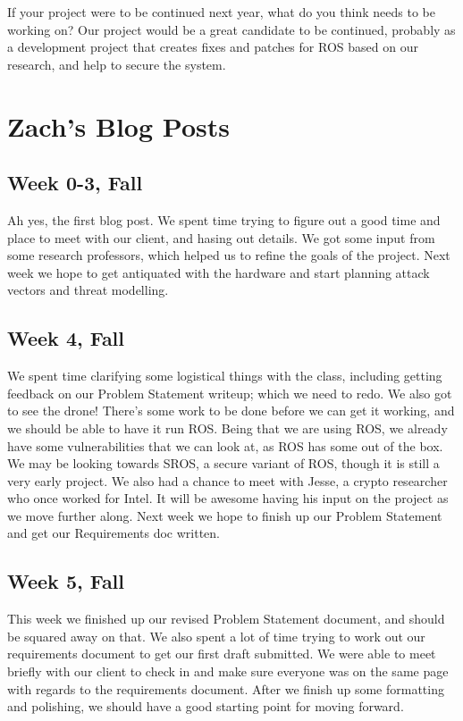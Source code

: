 \documentclass[IEEEtran,letterpaper,10pt,notitlepage,draftclsnofoot,onecolumn]{article}
\begin{document}
If your project were to be continued next year, what do you think needs to be working on? Our project would be a great candidate to be continued, probably as a development project that creates fixes and patches for ROS based on our research, and help to secure the system.

\section{Zach's Blog Posts}
\subsection{Week 0-3, Fall}
Ah yes, the first blog post. We spent time trying to figure out a good time and place to meet with our client, and hasing out details. We got some input from some research professors, which helped us to refine the goals of the project. Next week we hope to get antiquated with the hardware and start planning attack vectors and threat modelling.
\subsection{Week 4, Fall}
We spent time clarifying some logistical things with the class, including getting feedback on our Problem Statement writeup; which we need to redo. We also got to see the drone! There's some work to be done before we can get it working, and we should be able to have it run ROS. Being that we are using ROS, we already have some vulnerabilities that we can look at, as ROS has some out of the box. We may be looking towards SROS, a secure variant of ROS, though it is still a very early project. We also had a chance to meet with Jesse, a crypto researcher who once worked for Intel. It will be awesome having his input on the project as we move further along. Next week we hope to finish up our Problem Statement and get our Requirements doc written.
\subsection{Week 5, Fall}
This week we finished up our revised Problem Statement document, and should be squared away on that. We also spent a lot of time trying to work out our requirements document to get our first draft submitted. We were able to meet briefly with our client to check in and make sure everyone was on the same page with regards to the requirements document. After we finish up some formatting and polishing, we should have a good starting point for moving forward.
\end{document}
